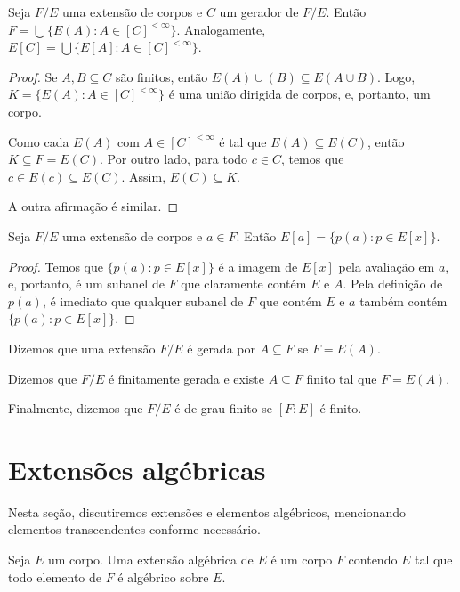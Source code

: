 \begin{lemma}
    Seja $F/E$ uma extensão de corpos e $C$ um gerador de $F/E$. Então $F=\bigcup\{E(A): A \in [C]^{<\infty}\}$. Analogamente, $E[C]=\bigcup\{E[A]: A \in [C]^{<\infty}\}$.
\end{lemma}

\begin{proof}
    Se $A, B\subseteq C$ são finitos, então $E(A)\cup (B)\subseteq E(A\cup B)$. Logo, $K=\{E(A): A \in [C]^{<\infty}\}$ é uma união dirigida de corpos, e, portanto, um corpo.

    Como cada $E(A)$ com $A\in [C]^{<\infty}$ é tal que $E(A)\subseteq E(C)$, então $K\subseteq F=E(C)$.
    Por outro lado, para todo $c \in C$, temos que $c \in E(c)\subseteq E(C)$.
    Assim, $E(C)\subseteq K$.

    A outra afirmação é similar.
\end{proof}

\begin{lemma}
    Seja $F/E$ uma extensão de corpos e $a \in F$. Então $E[a]=\{p(a): p \in E[x]\}$.
\end{lemma}

\begin{proof}
    Temos que $\{p(a): p \in E[x]\}$ é a imagem de $E[x]$ pela avaliação em $a$, e, portanto, é um subanel de $F$ que claramente contém $E$ e $A$. Pela definição de $p(a)$, é imediato que qualquer subanel de $F$ que contém $E$ e $a$ também contém $\{p(a): p \in E[x]\}$.
\end{proof}
\begin{definition}
Dizemos que uma extensão $F/E$ é gerada por $A\subseteq F$ se $F=E(A)$.

Dizemos que $F/E$ é finitamente gerada e existe $A\subseteq F$ finito tal que $F=E(A)$.

Finalmente, dizemos que $F/E$ é de grau finito se $[F:E]$ é finito.
\end{definition}
\section{Extensões algébricas}
Nesta seção, discutiremos extensões e elementos algébricos, mencionando elementos transcendentes conforme necessário.
\begin{definition}
Seja $E$ um corpo.
Uma extensão algébrica de $E$ é um corpo $F$ contendo $E$ tal que todo elemento de $F$ é algébrico sobre $E$.
\end{definition}


